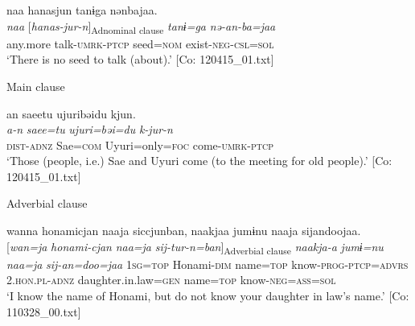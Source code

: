 \ex
{\TM}
\glll  naa  hanasjun  tanɨga  nənbajaa.\\
\textit{naa}  [\textit{hanas-jur-n}]\textsubscript{Adnominal clause}  \textit{tanɨ=ga}  \textit{nə-an-ba=jaa}\\
any.more  talk-\textsc{umrk}-\textsc{ptcp}  seed=\textsc{nom}  exist-\textsc{neg}-\textsc{csl}=\textsc{sol}\\
\glt ‘There is no seed to talk (about).’ [Co: 120415\_01.txt]

  Main clause

\ex
{\TM}
\glll  an  saeetu  ujuribəidu  kjun.\\
\textit{a-n}  \textit{saee=tu}  \textit{ujuri=bəi=du}  \textit{k-jur-n}\\
\textsc{dist}-\textsc{adnz}  Sae=\textsc{com}  Uyuri=only=\textsc{foc}  come-\textsc{umrk}-\textsc{ptcp}\\
\glt ‘Those (people, i.e.) Sae and Uyuri come (to the meeting for old people).’ [Co: 120415\_01.txt]
\z

  Adverbial clause

\ex
{\TM}
\glll  wanna  honami{\textbar}cjan{\textbar}  naaja  siccjunban,      naakjaa  jumɨnu  naaja  sijandoojaa.\\
{}[\textit{wan=ja}  \textit{honami-cjan}  \textit{naa=ja}  \textit{sij-tur-n=ban}]\textsubscript{Adverbial clause}      \textit{naakja-a}  \textit{jumɨ=nu}  \textit{naa=ja}  \textit{sij-an=doo=jaa}
      1\textsc{sg}=\textsc{top}  Honami-\textsc{dim}  name=\textsc{top}  know-\textsc{prog}-\textsc{ptcp}=\textsc{advrs}  2.\textsc{hon}.\textsc{pl}-\textsc{adnz}  daughter.in.law=\textsc{gen}  name=\textsc{top}  know-\textsc{neg}=\textsc{ass}=\textsc{sol}\\
\glt ‘I know the name of Honami, but do not know your daughter in law’s name.’ [Co: 110328\_00.txt]
\z
\z

